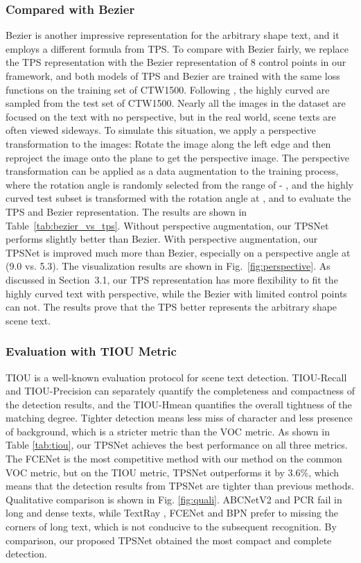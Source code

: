 \documentclass[sigconf]{acmart}
\begin{document}
	\subsubsection{Compared with Bezier}
	Bezier is another impressive representation for the arbitrary shape text, and it employs a  different formula from TPS. To compare with Bezier fairly, we replace the TPS representation with the Bezier representation of 8 control points in our framework, and both models of TPS and Bezier are trained with the same loss functions on the training set of CTW1500. Following  \cite{zhu2021fourier}, the highly curved are sampled from the test set of CTW1500. Nearly all the images in the dataset are focused on the text with no perspective, but in the real world, scene texts are often viewed sideways. To simulate this situation, we apply a perspective transformation to the images: Rotate the image along the left edge and then reproject the image onto the plane to get the perspective image. The perspective transformation can be applied as a data augmentation to the training process, where the rotation angle is randomly selected from the range of - , and the highly curved test subset is transformed with the rotation angle at ,  and  to evaluate the TPS and Bezier representation. The results are shown in Table~\ref{tab:bezier_vs_tps}. Without perspective augmentation, our TPSNet performs slightly better than Bezier. With perspective augmentation, our TPSNet is improved much more than Bezier, especially on a perspective angle at  (9.0 vs. 5.3). The visualization results are shown in Fig.~\ref{fig:perspective}. As discussed in Section~3.1, our TPS representation has more flexibility to fit the highly curved text with perspective, while the Bezier with limited control points can not. The results prove that the TPS better represents the arbitrary shape scene text.
	
	
	\subsubsection{Evaluation with TIOU Metric}
	TIOU \cite{liu2019tightness} is a well-known evaluation protocol for scene text detection. TIOU-Recall and TIOU-Precision can separately quantify the completeness and compactness of the detection results, and the TIOU-Hmean quantifies the overall tightness of the matching degree. Tighter detection means less miss of character and less presence of background, which is a stricter metric than the VOC metric. As shown in Table \ref{tab:tiou}, our TPSNet achieves the best performance on all three metrics. The FCENet \cite{zhu2021fourier} is the most competitive method with our method on the common VOC metric, but on the TIOU metric, TPSNet outperforms it by 3.6\%, which means that the detection results from TPSNet are tighter than previous methods.
	Qualitative comparison is shown in Fig. \ref{fig:quali}. ABCNetV2 \cite{Liu2020ABCNet} and PCR \cite{dai2021progressive} fail in long and dense texts, while TextRay \cite{Wang2020textray}, FCENet \cite{zhu2021fourier} and BPN \cite{zhang2021adaptive} prefer to missing the corners of long text, which is not conducive to the subsequent recognition. By comparison, our proposed TPSNet obtained the most compact and complete detection.
	
\end{document}
